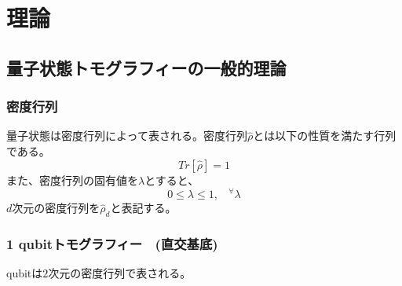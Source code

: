 \documentclass[11pt,a4j,notitlepage]{jreport}
\begin{document}
	\chapter{理論}
	\section{量子状態トモグラフィーの一般的理論}


	\subsection{密度行列}

	量子状態は密度行列によって表される。密度行列$\hat{\rho}$とは以下の性質を満たす行列である。
	\begin{equation}
		Tr[\hat{\rho}]=1
		\label{eq2.1}
	\end{equation}
	また、密度行列の固有値を$\lambda$とすると、
	\begin{equation}
		0 \leq \lambda \leq 1, \ \ \ \  ^\forall \lambda
		\label{eq2.2}
	\end{equation}
	$d$次元の密度行列を$\hat{\rho}_d$と表記する。



	\subsection{1 qubitトモグラフィー　(直交基底)}

	qubitは$2$次元の密度行列で表される。
\end{document}
